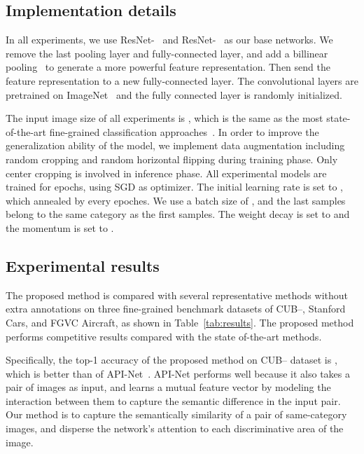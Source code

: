 \documentclass[conference]{IEEEtran}
\begin{document}
\subsection{Implementation details}
In all experiments, we use ResNet-~\cite{he2016deep} and ResNet-~\cite{he2016deep} as our base networks. We remove the last pooling layer and fully-connected layer, and add a billinear pooling~\cite{lin2015bilinear} to generate a more powerful feature representation. Then send the feature representation to a new fully-connected layer. The convolutional layers are pretrained on ImageNet~\cite{deng2009imagenet} and the fully connected layer is randomly initialized.

The input image size of all experiments is , which is the same as the most state-of-the-art fine-grained classification approaches~\cite{wang2018learning,yang2018learning,Zheng_2019_CVPR,sun2018multi,2020CIN}. In order to improve the generalization ability of the model, we implement data augmentation including random cropping and random horizontal flipping during training phase. Only center cropping is involved in inference phase. All experimental models are trained for  epochs, using SGD as optimizer. The initial learning rate is set to , which annealed by  every  epoches. We use a batch size of , and the last  samples belong to the same category as the first  samples. The weight decay is set to  and the momentum is set to .

\subsection{Experimental results}
The proposed method is compared with several representative methods without extra annotations on three fine-grained benchmark datasets of CUB--, Stanford Cars, and FGVC Aircraft, as shown in Table~\ref{tab:results}. The proposed method performs competitive results compared with the state of-the-art methods.

Specifically, the top-1 accuracy of the proposed method on CUB-- dataset is , which is better than  of API-Net~\cite{zhuang2020learning}. API-Net performs well because it also takes a pair of images as input, and learns a mutual feature vector by modeling the interaction between them to capture the semantic difference in the input pair. Our method is to capture the semantically similarity of a pair of same-category images, and disperse the network's attention to each discriminative area of the image.
\end{document}
